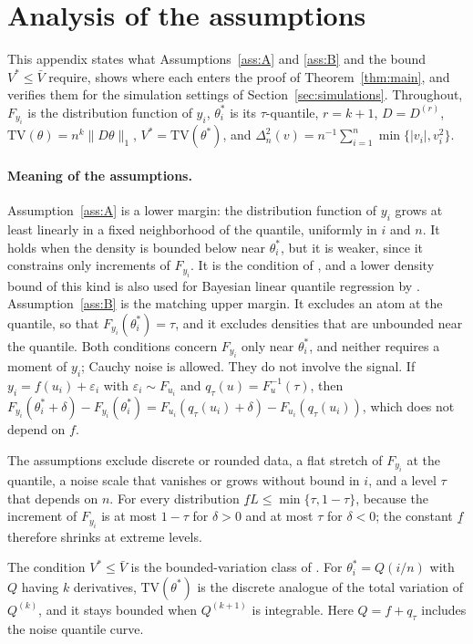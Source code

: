 \section{Analysis of the assumptions}\label{app:assumptions}

This appendix states what Assumptions~\ref{ass:A} and \ref{ass:B} and the bound $V^*\le\bar V$ require, shows where each enters the proof of Theorem~\ref{thm:main}, and verifies them for the simulation settings of Section~\ref{sec:simulations}. Throughout, $F_{y_i}$ is the distribution function of $y_i$, $\theta^*_i$ is its $\tau$-quantile, $r=k+1$, $D=D^{(r)}$, $\mathrm{TV}(\theta)=n^k\|D\theta\|_1$, $V^*=\mathrm{TV}(\theta^*)$, and $\Delta_n^2(v)=n^{-1}\sum_{i=1}^n\min\{|v_i|,v_i^2\}$.

\paragraph{Meaning of the assumptions.}
Assumption~\ref{ass:A} is a lower margin: the distribution function of $y_i$ grows at least linearly in a fixed neighborhood of the quantile, uniformly in $i$ and $n$. It holds when the density is bounded below near $\theta^*_i$, but it is weaker, since it constrains only increments of $F_{y_i}$. It is the condition of \citet{madrid2022risk}, and a lower density bound of this kind is also used for Bayesian linear quantile regression by \citet{sriram2013posterior}. Assumption~\ref{ass:B} is the matching upper margin. It excludes an atom at the quantile, so that $F_{y_i}(\theta^*_i)=\tau$, and it excludes densities that are unbounded near the quantile. Both conditions concern $F_{y_i}$ only near $\theta^*_i$, and neither requires a moment of $y_i$; Cauchy noise is allowed. They do not involve the signal. If $y_i=f(u_i)+\varepsilon_i$ with $\varepsilon_i\sim F_{u_i}$ and $q_\tau(u)=F_u^{-1}(\tau)$, then $F_{y_i}(\theta^*_i+\delta)-F_{y_i}(\theta^*_i)=F_{u_i}(q_\tau(u_i)+\delta)-F_{u_i}(q_\tau(u_i))$, which does not depend on $f$.

The assumptions exclude discrete or rounded data, a flat stretch of $F_{y_i}$ at the quantile, a noise scale that vanishes or grows without bound in $i$, and a level $\tau$ that depends on $n$. For every distribution $\underline f L\le\min\{\tau,1-\tau\}$, because the increment of $F_{y_i}$ is at most $1-\tau$ for $\delta>0$ and at most $\tau$ for $\delta<0$; the constant $\underline f$ therefore shrinks at extreme levels.

The condition $V^*\le\bar V$ is the bounded-variation class of \citet{tibshirani2014adaptive}. For $\theta^*_i=Q(i/n)$ with $Q$ having $k$ derivatives, $\mathrm{TV}(\theta^*)$ is the discrete analogue of the total variation of $Q^{(k)}$, and it stays bounded when $Q^{(k+1)}$ is integrable. Here $Q=f+q_\tau$ includes the noise quantile curve.

